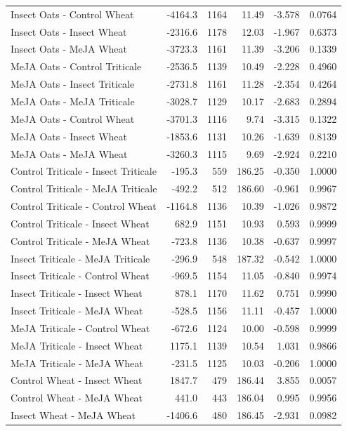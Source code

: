 \documentclass[12pt, letterpaper, ]{report}
\begin{document}
{\begin{center}
\begin{longtable}{lrrrrr}
            Insect Oats - Control Wheat &-4164.3 &1164 & 11.49 & -3.578 & 0.0764  \\
            Insect Oats - Insect Wheat &-2316.6 &1178 & 12.03 & -1.967 & 0.6373 \\
            Insect Oats - MeJA Wheat &-3723.3 &1161 & 11.39 & -3.206 & 0.1339 \\
            MeJA Oats - Control Triticale &-2536.5 &1139 & 10.49 & -2.228 & 0.4960 \\
            MeJA Oats - Insect Triticale &-2731.8 &1161 & 11.28 & -2.354 & 0.4264 \\
            MeJA Oats - MeJA Triticale &-3028.7 &1129 & 10.17 & -2.683 & 0.2894 \\
            MeJA Oats - Control Wheat &-3701.3 &1116 & 9.74 & -3.315 & 0.1322 \\
            MeJA Oats - Insect Wheat &-1853.6 &1131 & 10.26 & -1.639 & 0.8139 \\
            MeJA Oats - MeJA Wheat &-3260.3 &1115 & 9.69 & -2.924 & 0.2210 \\
            Control Triticale - Insect Triticale & -195.3 & 559 & 186.25 & -0.350 & 1.0000 \\
            Control Triticale - MeJA Triticale & -492.2 & 512 & 186.60 & -0.961 & 0.9967 \\
            Control Triticale - Control Wheat &-1164.8 &1136 & 10.39 & -1.026 & 0.9872 \\
            Control Triticale - Insect Wheat & 682.9 &1151 & 10.93 & 0.593 & 0.9999 \\
            Control Triticale - MeJA Wheat & -723.8 &1136 & 10.38 & -0.637 & 0.9997 \\
            Insect Triticale - MeJA Triticale & -296.9 & 548 & 187.32 & -0.542 & 1.0000 \\
            Insect Triticale - Control Wheat & -969.5 &1154 & 11.05 & -0.840 & 0.9974 \\
            Insect Triticale - Insect Wheat & 878.1 &1170 & 11.62 & 0.751 & 0.9990 \\
            Insect Triticale - MeJA Wheat & -528.5 &1156 & 11.11 & -0.457 & 1.0000 \\
            MeJA Triticale - Control Wheat & -672.6 &1124 & 10.00 & -0.598 & 0.9999 \\
            MeJA Triticale - Insect Wheat & 1175.1 &1139 & 10.54 & 1.031 & 0.9866 \\
            MeJA Triticale - MeJA Wheat & -231.5 &1125 & 10.03 & -0.206 & 1.0000 \\
            Control Wheat - Insect Wheat & 1847.7 & 479 & 186.44 & 3.855 & 0.0057 \\
            Control Wheat - MeJA Wheat & 441.0 & 443 & 186.04 & 0.995 & 0.9956 \\
            Insect Wheat - MeJA Wheat &-1406.6 & 480 & 186.45 & -2.931 & 0.0982 \\
\end{longtable}
\end{center}
}
\end{document}
